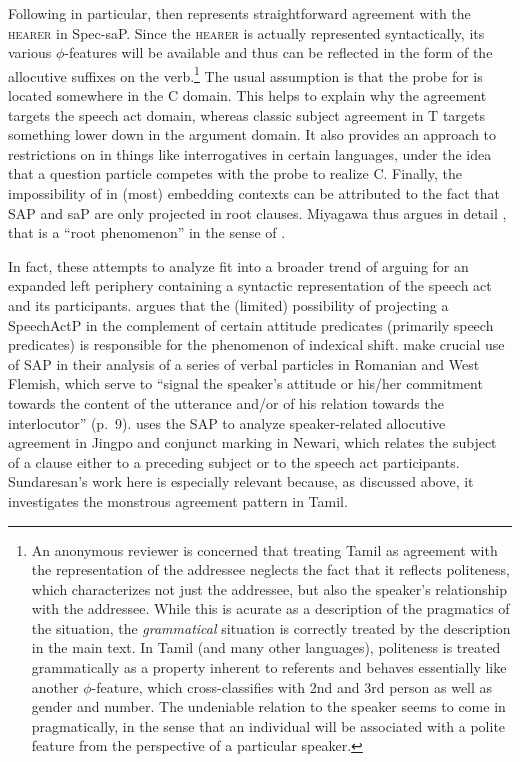 \documentclass[output=paper, modfonts, nonflat]{langsci/langscibook}
\begin{document}
\noindent Following \citet{miyagawa:2017} in particular, \allagr{} then
represents straightforward agreement with the \textsc{hearer} in
Spec-saP. Since the \textsc{hearer} is actually represented
syntactically, its various $\phi$-features will be available and thus
can be reflected in the form of the allocutive suffixes on the
verb.\footnote{An anonymous reviewer is concerned that treating Tamil
  \allagr{} as agreement with the representation of the addressee
  neglects the fact that it reflects politeness, which characterizes
  not just the addressee, but also the speaker's relationship with the
  addressee. While this is acurate as a description of the pragmatics
  of the situation, the \emph{grammatical} situation is correctly
  treated by the description in the main text. In Tamil (and many
  other languages), politeness is treated grammatically as a property
  inherent to referents and behaves essentially like another
  $\phi$-feature, which cross-classifies with 2nd and 3rd person as
  well as gender and number. The undeniable relation to the speaker
  seems to come in pragmatically, in the sense that an individual will
  be associated with a polite feature from the perspective of a
  particular speaker.}  The usual assumption is that the probe for
\allagr{} is located somewhere in the C domain. This helps to explain
why the agreement targets the speech act domain, whereas classic
subject agreement in T targets something lower down in the argument
domain. It also provides an approach to restrictions on \allagr{} in
things like interrogatives in certain languages, under the idea that a
question particle competes with the \allagr{} probe to realize
C. Finally, the impossibility of \allagr{} in (most) embedding
contexts can be attributed to the fact that SAP and saP are only
projected in root clauses. Miyagawa thus argues in detail \citep[see
especially][]{miyagawa:2012}, that \allagr{} is a ``root phenomenon'' in
the sense of \citet{emonds:1970}.

In fact, these attempts to analyze \allagr{} fit into a broader trend
of arguing for an expanded left periphery containing a syntactic
representation of the speech act and its
participants. \citet{sundaresan:diss} argues that the (limited)
possibility of projecting a SpeechActP in the complement of certain
attitude predicates (primarily speech predicates) is responsible for
the phenomenon of indexical shift. \citet{haegemanhill:2011} make
crucial use of SAP in their analysis of a series of verbal particles
in Romanian and West Flemish, which serve to ``signal the speaker's
attitude or his/her commitment towards the content of the utterance
and/or of his relation towards the interlocutor'' (p.~9). 
\citet{zu:2015} uses the SAP to analyze speaker-related allocutive
agreement in Jingpo and conjunct marking in Newari, which relates the
subject of a clause either to a preceding subject or to the speech act
participants.  Sundaresan's work here is especially relevant because,
as discussed above, it investigates the monstrous agreement pattern in
Tamil.
\end{document}
